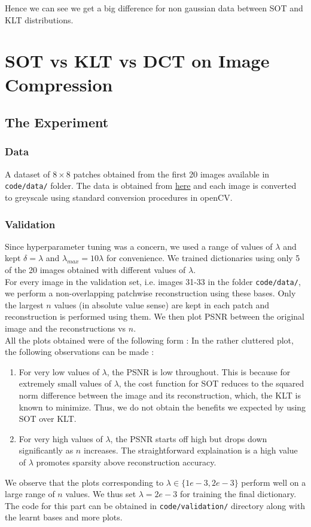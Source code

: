 \documentclass{article}
\theoremstyle{remark}
\begin{document}
Hence we can see we get a big difference for non gaussian data between SOT and KLT distributions.

\newpage
\section*{SOT vs KLT vs DCT on Image Compression}
\subsection*{The Experiment}
\subsubsection*{Data}
A dataset of $8\times 8$ patches obtained from the first 20 images available in {\tt code/data/} folder. The data is obtained from \href{http://sipi.usc.edu/database/database.php?volume=misc}{here} and each image is converted to greyscale using standard conversion procedures in openCV.
\subsubsection*{Validation}
Since hyperparameter tuning was a concern, we used a range of values of $\lambda$ and kept $\delta = \lambda$ and $\lambda_{max} = 10\lambda$ for convenience. We trained dictionaries using only 5 of the 20 images obtained with different values of $\lambda$.\\[1mm]
For every image in the validation set, i.e. images 31-33 in the folder {\tt code/data/}, we perform a non-overlapping patchwise reconstruction using these bases. Only the largest $n$ values (in absolute value sense) are kept in each patch and reconstruction is performed using them. We then plot PSNR between the original image and the reconstructions vs $n$.\\[1mm]
All the plots obtained were of the following form :
In the rather cluttered plot, the following observations can be made :
\begin{enumerate}
\item For very low values of $\lambda$, the PSNR is low throughout. This is because for extremely small values of $\lambda$, the cost function for SOT reduces to the squared norm difference between the image and its reconstruction, which, the KLT is known to minimize. Thus, we do not obtain the benefits we expected by using SOT over KLT.
\item For very high values of $\lambda$, the PSNR starts off high but drops down significantly as $n$ increases. The straightforward explaination is a high value of $\lambda$ promotes sparsity above reconstruction accuracy.
\end{enumerate}
We observe that the plots corresponding to $\lambda \in \{ 1e-3, 2e-3\}$ perform well on a large range of $n$ values. We thus set $\lambda = 2e-3$ for training the final dictionary. The code for this part can be obtained in {\tt code/validation/} directory along with the learnt bases and more plots.
\end{document}
